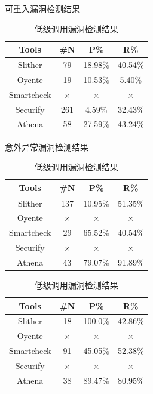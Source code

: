 \begin{table}[htbp]
  \centering
  \begin{minipage}[t]{0.48\textwidth}
  \caption{可重入漏洞检测结果}
    \begin{tabular}{cccc}
    \toprule
    Tools & \#N & P\% & R\% \\
    \midrule
    Slither & 79    & 18.98\%  & 40.54\% \\
    Oyente & 19  & 10.53\%     & 5.40\% \\
    Smartcheck  & $\times$     & $\times$  & $\times$  \\
    Securify &  261    & 4.59\%  & 32.43\% \\
    Athena & 58   & 27.59\%     & 43.24\% \\
    \bottomrule
    \end{tabular}%
  \label{tab:eval_reentrancy}%
  \end{minipage}
  \begin{minipage}[t]{0.48\textwidth}
    \caption{意外异常漏洞检测结果}
    \begin{tabular}{cccc}
    \toprule
    Tools & \#N & P\% & R\% \\
    \midrule
    Slither  & 137  & 10.95\%   & 51.35\% \\
    Oyente  & $\times$ & $\times$  & $\times$ \\
    Smartcheck  & 29  & 65.52\%   & 40.54\% \\
    Securify  & $\times$  & $\times$  & $\times$ \\
    Athena & 43   & 79.07\%     & 91.89\% \\
    \bottomrule
    \end{tabular}%
  \label{tab:eval_revert}%
  \end{minipage}
  \begin{minipage}[t]{0.48\textwidth}
    \caption{低级调用漏洞检测结果}
    \begin{tabular}{cccc}
    \toprule
    Tools & \#N & P\% & R\% \\
    \midrule
    Slither & 18   & 100.0\%     & 42.86\% \\
    Oyente  & $\times$ & $\times$ & $\times$ \\
    Smartcheck  & 91     & 45.05\%     & 52.38\% \\
    Securify & $\times$ & $\times$ & $\times$ \\
    Athena &  38  & 89.47\%    & 80.95\% \\
    \bottomrule
    \end{tabular}%

\end{minipage}
\end{table}

